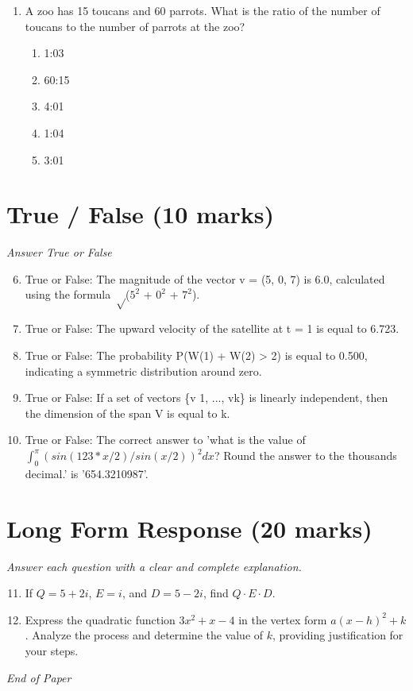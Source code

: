\documentclass[12pt]{article}
\begin{document}
\begin{enumerate}[label=\arabic*.]
\begin{enumerate}[label=(\alph*)]
    \item 2200
    \item 1800
    \item 2041
    \item 2100
    \item 1700
\end{enumerate}
\item A zoo has 15 toucans and 60 parrots. What is the ratio of the number of toucans to the number of parrots at the zoo?
\begin{enumerate}[label=(\alph*)]
    \item 1:03
    \item 60:15
    \item 4:01
    \item 1:04
    \item 3:01
\end{enumerate}
\end{enumerate}

\section*{True / False (10 marks)}
\textit{Answer True or False}
\begin{enumerate}[label=\arabic*.]
\setcounter{enumi}{5}
\item True or False: The magnitude of the vector v = (5, 0, 7) is 6.0, calculated using the formula \ensuremath{\sqrt}($5^2$ + $0^2$ + $7^2$).
\item True or False: The upward velocity of the satellite at t = 1 is equal to 6.723.
\item True or False: The probability P(W(1) + W(2) \textgreater{} 2) is equal to 0.500, indicating a symmetric distribution around zero.
\item True or False: If a set of vectors \{v 1, ..., vk\} is linearly independent, then the dimension of the span V is equal to k.
\item True or False: The correct answer to 'what is the value of $\int_{0}^\pi (sin(123*x/2)/sin(x/2))^2 dx$? Round the answer to the thousands decimal.' is '654.3210987'.
\end{enumerate}

\section*{Long Form Response (20 marks)}
\textit{Answer each question with a clear and complete explanation.}
\begin{enumerate}[label=\arabic*.]
\setcounter{enumi}{10}
\item If $Q = 5+2 i$, $E = i$, and $D = 5-2 i$, find $Q\cdot E \cdot D$.
\item Express the quadratic function \(3 x^2 + x - 4\) in the vertex form \(a(x - h)^2 + k\). Analyze the process and determine the value of \(k\), providing justification for your steps.
\end{enumerate}

\vfill
\noindent\textit{End of Paper}
\end{document}
